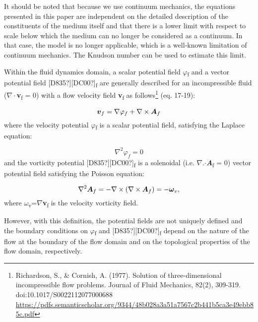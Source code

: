 \documentclass[a4paper]{article}
\newcommand\textstyleNone[1]{#1}
\newcommand\boldsubformula[1]{\text{\mathversion{bold}$#1$}}
\begin{document}
{
\textstyleNone{{It should be noted that because we use continuum
mechanics, the equations presented in this paper are independent on the detailed description of the constituents of the
medium itself and that there is a lower limit with respect to scale below which the medium can no longer be considered
as a continuum. In that case, the model is no longer applicable, which is a well-known limitation of continuum
mechanics. The Knudson number can be used to estimate this limit. }}}

{
\textstyleNone{{W}{ithin
the fluid dynamics domain, a scalar potential field}{ $\varphi
$}{\textsubscript{f}}{
}{and a vector potential field
}{[D835?][DC00?]}{\textsubscript{f}}{
are generally described for an incompressible fluid (}${\nabla}{\cdot}$\textbf{v}\textsubscript{f }=
0){ with a flow velocity field
}\textbf{{v}}{\textsubscript{f}}{
as follows}}\footnote{ Richardson, S., \& Cornish, A. (1977). Solution of three-dimensional incompressible flow
problems. Journal of Fluid Mechanics, 82(2), 309-319. doi:10.1017/S0022112077000688
\url{https://pdfs.semanticscholar.org/9344/48b028a3a51a7567c2b441b5ca3e49ebb85c.pdf} \par
}\textstyleNone{{ (eq. 17-19):}}}

\begin{equation}
\boldsubformula v_f=\nabla \varphi _f+\nabla \times \boldsubformula A_f
\end{equation}
{
\textstyleNone{{where the velocity potential
}{$\varphi
$}{\textsubscript{f}}{
is a scalar potential field, satisfying the Laplace equation:}}}

\begin{equation}
\nabla ^2\varphi _f=0
\end{equation}
{
\textstyleNone{{and the vorticity potential
}{[D835?][DC00?]}{\textsubscript{f}}{
is a solenoidal (i.e.
}{${\nabla}$.${\cdot}$}\textbf{\textit{{A}}}{\textsubscript{f}}{
= 0) vector potential field satisfying the Poisson equation:}}}

\begin{equation}
\nabla ^2\boldsubformula A_f=-\nabla \times (\nabla \times \boldsubformula A_f)=-\boldsubformula{\omega }_v,
\end{equation}
{
\textstyleNone{{where
}\textbf{{$\omega
$}}{\textsubscript{v}}{=}{${\nabla}$}{{\texttimes}}\textbf{{v}}{\textsubscript{f}}{
 is the }{velocity
}{vorticity field.}}}

{
\textstyleNone{{However, with this definition, the potential fields
are not uniquely defined and the boundary conditions on }{$\varphi
$}{\textsubscript{f 
}}{and
}{[D835?][DC00?]}{\textsubscript{f}}{
depend on the nature of the flow at the boundary of the flow domain and on the topological properties of the flow
domain, respectively.  }}}
\end{document}
